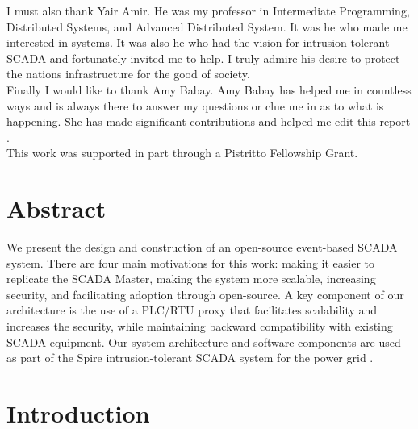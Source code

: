 \documentclass[oneside,11pt,a4paper,oldfontcommands]{book}
\begin{document}
\indent I must also thank Yair Amir. He was my professor in Intermediate Programming, 
Distributed Systems, and Advanced Distributed System. It was he who made me
interested in systems. It was also he who had the vision for intrusion-tolerant
SCADA and fortunately invited me to help. I truly admire his desire to
protect the nations infrastructure for the good of society. \\

\indent 
Finally I would like to thank Amy Babay. Amy Babay has helped me in countless ways
and is always there to answer my questions or clue me in as to what is happening. 
She has made significant contributions and helped me edit this report .\\

\indent
This work was supported in part through a Pistritto Fellowship Grant. \\
\clearpage
\tableofcontents*

\clearpage

\chapter{Abstract}

\indent \indent
We present the design and construction of an open-source event-based SCADA system. There are four main motivations 
for this work: making it easier to replicate the SCADA Master, making the
system more scalable, increasing security, and facilitating adoption
 through open-source. A key component of our architecture
is the use of a PLC/RTU proxy that facilitates scalability and increases
the security, while maintaining backward compatibility with existing
SCADA equipment. Our system architecture and software components are used
as part 
of the Spire intrusion-tolerant SCADA system for the power grid \cite{Spire}. \\


\chapter{Introduction}

\end{document}
